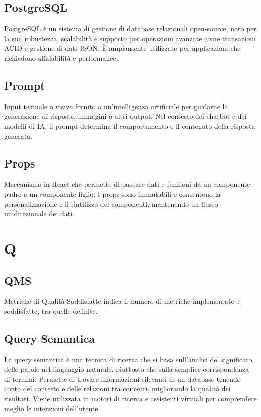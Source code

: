 \documentclass{article}
\begin{document}
\subsection{PostgreSQL}
PostgreSQL è un sistema di gestione di database relazionali open-source, noto per la sua robustezza, scalabilità e supporto per operazioni avanzate come transazioni ACID e gestione di dati JSON. È ampiamente utilizzato per applicazioni che richiedono affidabilità e performance.

\subsection{Prompt}
Input testuale o visivo fornito a un'intelligenza artificiale per guidarne la generazione di risposte, immagini o altri output. Nel contesto dei chatbot e dei modelli di IA, il prompt determina il comportamento e il contenuto della risposta generata.

\subsection{Props}
Meccanismo in React che permette di passare dati e funzioni da un componente padre a un componente figlio. I props sono immutabili e consentono la personalizzazione e il riutilizzo dei componenti, mantenendo un flusso unidirezionale dei dati.

\newpage
\section{Q}

\subsection{QMS}
Metriche di Qualità Soddisfatte indica il numero di metriche implementate e soddisfatte, tra quelle definite.

\subsection{Query Semantica}
La query semantica è una tecnica di ricerca che si basa sull'analisi del significato delle parole nel linguaggio naturale, piuttosto che sulla semplice corrispondenza di termini. Permette di trovare informazioni rilevanti in un database tenendo conto del contesto e delle relazioni tra concetti, migliorando la qualità dei risultati. Viene utilizzata in motori di ricerca e assistenti virtuali per comprendere meglio le intenzioni dell'utente.
\end{document}
